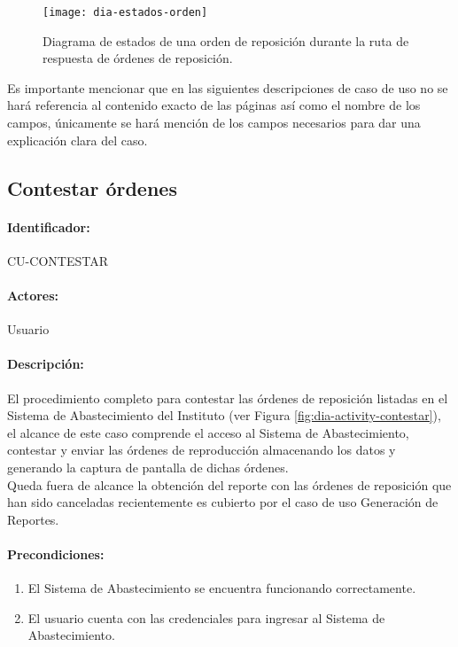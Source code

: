 \begin{figure}[h]
  \centering
  \texttt{[image: dia-estados-orden]} 
  \caption{Diagrama de estados de una orden de reposición durante la ruta de respuesta de órdenes de reposición.}
  \label{fig:dia-estados-orden}
\end{figure}

Es importante mencionar que en las siguientes descripciones de caso de uso no se hará referencia al contenido exacto de las páginas así como el nombre de los campos, únicamente se hará mención de los campos necesarios para dar una explicación clara del caso.

\subsection{Contestar órdenes}\label{cu-contestar}
\paragraph{Identificador:}
CU-CONTESTAR
\paragraph{Actores:}
Usuario
\paragraph{Descripción:}
El procedimiento completo para contestar las órdenes de reposición listadas en el Sistema de Abastecimiento del Instituto (ver Figura \ref{fig:dia-activity-contestar}), el alcance de este caso comprende el acceso al Sistema de Abastecimiento, contestar y enviar las órdenes de reproducción almacenando los datos y generando la captura de pantalla de dichas órdenes.\\
Queda fuera de alcance la obtención del reporte con las órdenes de reposición que han sido canceladas recientemente es cubierto por el caso de uso Generación de Reportes.
\paragraph{Precondiciones:}
\begin{enumerate}
  \item El Sistema de Abastecimiento se encuentra funcionando correctamente.
  \item El usuario cuenta con las credenciales para ingresar al Sistema de Abastecimiento.
\end{enumerate}
